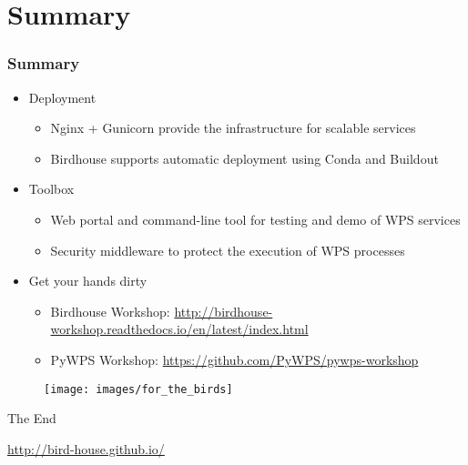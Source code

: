 \documentclass{beamer}
\begin{document}
\section{Summary}

\begin{frame}
\frametitle<presentation>{Summary}

\begin{itemize}

  \item Deployment
  \begin{itemize}
    \item Nginx + Gunicorn provide the infrastructure for scalable services
    \item Birdhouse supports automatic deployment using Conda and Buildout
  \end{itemize}

  \item{Toolbox}
  \begin{itemize}
    \item Web portal and command-line tool for testing and demo of WPS services
    \item Security middleware to protect the execution of WPS processes
  \end{itemize}

  \item{Get your hands dirty}
  \begin{itemize}
    \item Birdhouse Workshop: \url{http://birdhouse-workshop.readthedocs.io/en/latest/index.html}
    \item PyWPS Workshop: \url{https://github.com/PyWPS/pywps-workshop}
  \end{itemize}
\end{itemize}

\end{frame}

\begin{frame}

  \begin{figure}[ht]
   \centering
   \texttt{[image: images/for\_the\_birds]}
  \end{figure}

\centering
\Huge{The End}

\centering
\vspace{0.4cm}
\footnotesize{\url{http://bird-house.github.io/}}
\end{frame}
\end{document}
